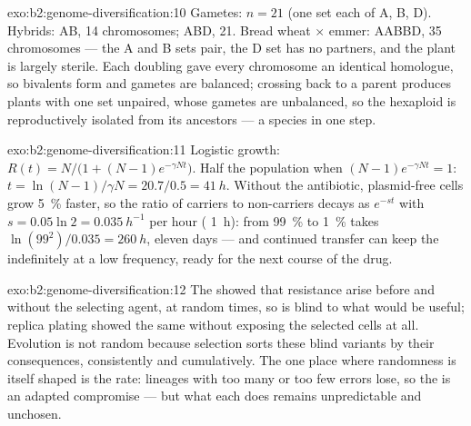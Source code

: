 \begin{solution}{exo:b2:genome-diversification:10}
Gametes: $n = 21$ (one set each of A, B, D). Hybrids: AB, 14
chromosomes; ABD, 21. Bread wheat $\times$ emmer: AABBD, 35
chromosomes --- the A and B sets pair, the D set has no partners,
and the plant is largely sterile. Each doubling gave every
chromosome an identical homologue, so bivalents form and gametes are
balanced; crossing back to a parent produces plants with one set
unpaired, whose gametes are unbalanced, so the hexaploid is
reproductively isolated from its ancestors --- a species in one step.
\end{solution}

\begin{solution}{exo:b2:genome-diversification:11}
Logistic growth: $R(t) = N/\bigl(1 + (N - 1)e^{-\gamma Nt}\bigr)$.
Half the population when $(N - 1)e^{-\gamma Nt} = 1$: $t = \ln(N -
1)/\gamma N = 20.7/0.5 = \qty{41}{h}$. Without the antibiotic,
plasmid-free cells grow \qty{5}{\%} faster, so the ratio of carriers
to non-carriers decays as $e^{-st}$ with $s = 0.05\ln 2 =
\qty{0.035}{h^{-1}}$ per hour ( \qty{1}{h}): from
\qty{99}{\%} to \qty{1}{\%} takes $\ln(99^2)/0.035 = \qty{260}{h}$,
eleven days --- and continued transfer can keep the 
indefinitely at a low frequency, ready for the next course of the
drug.
\end{solution}

\begin{solution}{exo:b2:genome-diversification:12}
The  showed that resistance  arise before
and without the selecting agent, at random times, so  is
blind to what would be useful; replica plating showed the same
without exposing the selected cells at all. Evolution is not random
because selection sorts these blind variants by their consequences,
consistently and cumulatively. The one place where randomness is
itself shaped is the rate: lineages with too many or too few errors
lose, so the  is an adapted compromise --- but what
each  does remains unpredictable and unchosen.
\end{solution}

